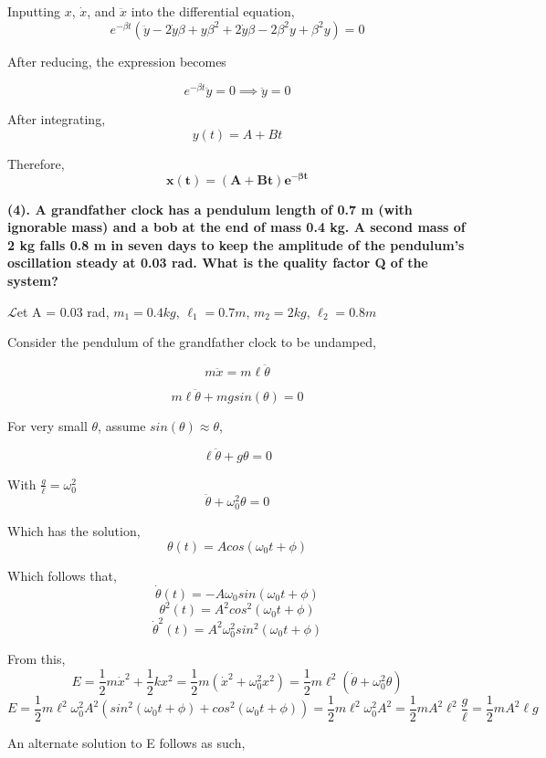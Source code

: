 \documentclass[12pt]{article}
\begin{document}
Inputting $x$, $\dot{x}$, and $\ddot{x}$ into the differential equation, 
$$
e^{-\beta t} ( \ddot{y} - 2 \dot{y} \beta + y \beta^2 + 2 \dot{y} \beta - 2 \beta^2 y + \beta^2 y ) = 0
$$

After reducing, the expression becomes 

$$
e^{- \beta t} \ddot{y} = 0 \implies \ddot{y} = 0
$$

After integrating,
$$
y(t) = A + Bt
$$

Therefore, 
$$
\boldsymbol{x(t) = (A + Bt) e^{-\beta t}}
$$



\newpage
\textbf{
(4). A grandfather clock has a pendulum length of 0.7 m (with ignorable mass)
and a bob at the end of mass 0.4 kg. A second mass of 2 kg falls 0.8 m in seven days to keep
the amplitude of the pendulum’s oscillation steady at 0.03 rad. What is the quality factor Q of the system?
}

$\mathscr{L}$et A = 0.03 rad, $m_1 = 0.4 kg$, $\ell_1 = 0.7m$, $m_2 = 2 kg$, $\ell_2 = 0.8m$

\vspace{0.5cm}

Consider the pendulum of the grandfather clock to be undamped,

$$
m \ddot{x} = m \ell \ddot{\theta}
$$

$$
m \ell \ddot{\theta} + mg sin(\theta) = 0
$$

For very small $\theta$, assume $sin(\theta) \approx \theta$,

$$
\ell \ddot{\theta} + g \theta = 0
$$

With $\frac{g}{\ell} = \omega_0^2$
$$
\ddot{\theta} + \omega_0^2 \theta = 0
$$

Which has the solution,
$$
\theta(t) = A cos(\omega_0 t + \phi)
$$

Which follows that,
$$
\dot{\theta}(t) = -A \omega_0 sin(\omega_0 t + \phi)
$$
$$
\theta^2(t) = A^2 cos^2(\omega_0 t + \phi)
$$
$$
\dot{\theta}^2(t) = A^2 \omega_0^2 sin^2(\omega_0 t + \phi)
$$

From this,
$$
E = \frac{1}{2} m \dot{x}^2 + \frac{1}{2}kx^2 = \frac{1}{2}m(\dot{x}^2 + \omega_0^2 x^2) = \frac{1}{2} m \ell^2 (\dot{\theta} + \omega_0^2 \theta)
$$
$$
E = \frac{1}{2} m \ell^2 \omega_0^2 A^2 ( sin^2(\omega_0 t + \phi) + cos^2(\omega_0 t + \phi) ) = \frac{1}{2} m \ell^2 \omega_0^2 A^2 = \frac{1}{2} m A^2 \ell^2 \frac{g}{\ell} = \frac{1}{2} m A^2 \ell g
$$

An alternate solution to E follows as such,
\end{document}
